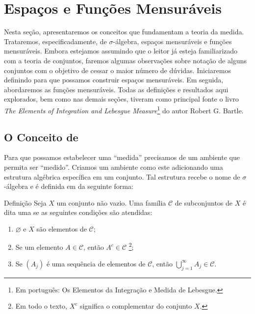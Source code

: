 \chapter{Espaços e Funções Mensuráveis}

Nesta seção, apresentaremos os conceitos que fundamentam a teoria da medida. Trataremos, especificadamente, de $\sigma$-álgebra, espaços mensuráveis e funções mensuráveis. 
Embora estejamos assumindo que o leitor já esteja familiarizado com a teoria de conjuntos, faremos algumas observações sobre notação de alguns conjuntos com o objetivo de cessar o maior número de dúvidas.
Iniciaremos definindo \sigal para que possamos construir espaços mensuráveis.
Em seguida, abordaremos as funções mensuráveis.
Todas as definições e resultados aqui explorados, bem como nas demais seções,  tiveram como principal fonte o livro \textit{The Elements of Integration and Lebesgue Measure}\footnote{Em português: Os Elementos da Integração e Medida de Lebesgue.} do autor Robert G. Bartle.

\section{O Conceito de \sigal}
Para que possamos estabelecer uma \enquote{medida} precisamos de um ambiente que permita ser \enquote{medido}. 
Criamos um ambiente como este adicionando uma estrutura algébrica específica em um conjunto.
Tal estrutura recebe o nome de $\sigma$-álgebra e é definida em \cite{bartle} da seguinte forma:

\begin{env}{Definição}
\label{def:sigma-algebra}
    Seja $X$ um conjunto não vazio. Uma família $\mathcal{C}$ de subconjuntos de $X$ é dita uma \sigal se as seguintes condições são atendidas:
    \begin{enumerate}[label*= (\roman*)]
        \item $\varnothing$ e $X$ são elementos de $\mathcal{C}$;     
        \item Se um elemento $A \in \mathcal{C}$, então $A^c \in \mathcal{C}$
        \footnote{Em todo o texto, $X^c$ significa o complementar do conjunto $X$.};
        \item Se $(A_j)$ é uma sequência de elementos de $\mathcal{C}$, 
        então $\displaystyle \bigcup_{j = 1}^\infty A_j \in \mathcal{C}$.
        \vspace{-0.2cm}
    \end{enumerate}
\end{env}

